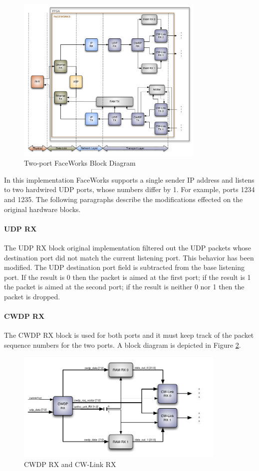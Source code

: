 \documentclass[conference]{IEEEtran}
\begin{document}
\begin{figure}[h]
  \centering
      \includegraphics[width=9cm]{Diagrams/FW-Final_paper.pdf}
  \caption{Two-port FaceWorks Block Diagram}\label{fig:FW-Final}
\end{figure}

In this implementation FaceWorks supports a single sender IP address and listens to two hardwired UDP ports, whose numbers differ by 1. For example, ports 1234 and 1235. The following paragraphs describe the modifications effected on the original hardware blocks.

\paragraph*{UDP RX} The UDP RX block original implementation filtered out the UDP packets whose destination port did not match the current listening port. This behavior has been modified. The UDP destination port field is subtracted from the base listening port. If the result is 0 then the packet is aimed at the first port; if the result is 1 the packet is aimed at the second port; if the result is neither 0 nor 1 then the packet is dropped.

\paragraph*{CWDP RX} The CWDP RX block is used for both ports and it must keep track of the packet sequence numbers for the two ports. A block diagram is depicted in Figure \ref{fig:CWDPRXDETAIL}.

\begin{figure}[h]
  \centering
      \includegraphics[width=10cm]{Diagrams/CWDP-RX-Detail.pdf}
  \caption{CWDP RX and CW-Link RX}\label{fig:CWDPRXDETAIL}
\end{figure}
\end{document}
